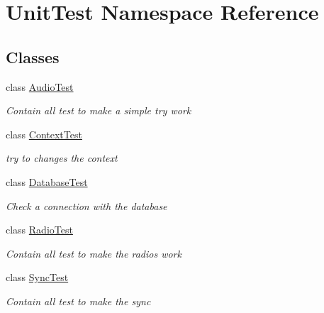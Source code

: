 \hypertarget{namespace_unit_test}{}\section{Unit\+Test Namespace Reference}
\label{namespace_unit_test}
\subsection*{Classes}
\begin{DoxyCompactItemize}
\item 
class \hyperlink{class_unit_test_1_1_audio_test}{Audio\+Test}
\begin{DoxyCompactList}\small\item\em Contain all test to make a simple try work \end{DoxyCompactList}\item 
class \hyperlink{class_unit_test_1_1_context_test}{Context\+Test}
\begin{DoxyCompactList}\small\item\em try to changes the context \end{DoxyCompactList}\item 
class \hyperlink{class_unit_test_1_1_database_test}{Database\+Test}
\begin{DoxyCompactList}\small\item\em Check a connection with the database \end{DoxyCompactList}\item 
class \hyperlink{class_unit_test_1_1_radio_test}{Radio\+Test}
\begin{DoxyCompactList}\small\item\em Contain all test to make the radios work \end{DoxyCompactList}\item 
class \hyperlink{class_unit_test_1_1_sync_test}{Sync\+Test}
\begin{DoxyCompactList}\small\item\em Contain all test to make the sync \end{DoxyCompactList}\end{DoxyCompactItemize}
